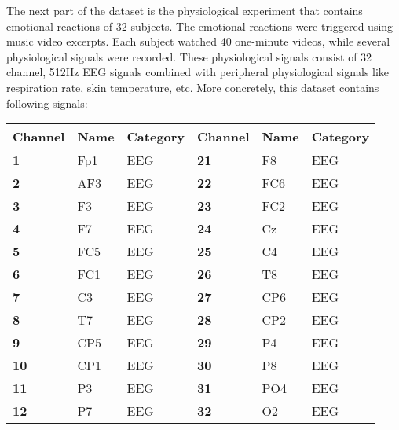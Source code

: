The next part of the dataset is the physiological experiment that contains emotional reactions of 32 subjects. The emotional reactions were triggered using music video excerpts. Each subject watched 40 one-minute videos, while several physiological signals were recorded. These physiological signals consist of 32 channel, 512Hz EEG signals combined with peripheral physiological signals like respiration rate, skin temperature, etc. More concretely, this dataset contains following signals:
\begin{table}[H]
\centering
\begin{tabular}{l|ll|l|ll}
\textbf{Channel} & \textbf{Name} & \textbf{Category} & \textbf{Channel} & \textbf{Name}    & \textbf{Category} \\ \hline
\textbf{1}       & Fp1           & EEG               & \textbf{21}      & F8               & EEG               \\
\textbf{2}       & AF3           & EEG               & \textbf{22}      & FC6              & EEG               \\
\textbf{3}       & F3            & EEG               & \textbf{23}      & FC2              & EEG               \\
\textbf{4}       & F7            & EEG               & \textbf{24}      & Cz               & EEG               \\
\textbf{5}       & FC5           & EEG               & \textbf{25}      & C4               & EEG               \\
\textbf{6}       & FC1           & EEG               & \textbf{26}      & T8               & EEG               \\
\textbf{7}       & C3            & EEG               & \textbf{27}      & CP6              & EEG               \\
\textbf{8}       & T7            & EEG               & \textbf{28}      & CP2              & EEG               \\
\textbf{9}       & CP5           & EEG               & \textbf{29}      & P4               & EEG               \\
\textbf{10}      & CP1           & EEG               & \textbf{30}      & P8               & EEG               \\
\textbf{11}      & P3            & EEG               & \textbf{31}      & PO4              & EEG               \\
\textbf{12}      & P7            & EEG               & \textbf{32}      & O2               & EEG               \\

\end{tabular}
\end{table}
